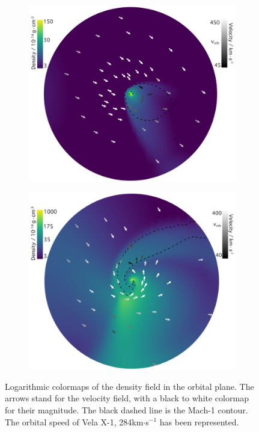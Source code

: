 \documentclass{aa}
\begin{document}
\begin{figure}
\begin{subfigure}{.5\textwidth}
\centering
\includegraphics[width=0.99\columnwidth]{Pictures/LF_adiab.jpeg}
  \label{fig:sfig1}
\end{subfigure}
\begin{subfigure}{.5\textwidth}
\centering
\includegraphics[width=0.99\columnwidth]{Pictures/HS_adiab.jpeg}
  \label{fig:sfig2}
\end{subfigure}
\caption{Logarithmic colormaps of the density field in the orbital plane. The arrows stand for the velocity field, with a black to white colormap for their magnitude. The black dashed line is the Mach-1 contour. The orbital speed of Vela X-1, 284km$\cdot$s$^{-1}$ has been represented.}
\label{fig:adiab}
\end{figure} 
\end{document}
